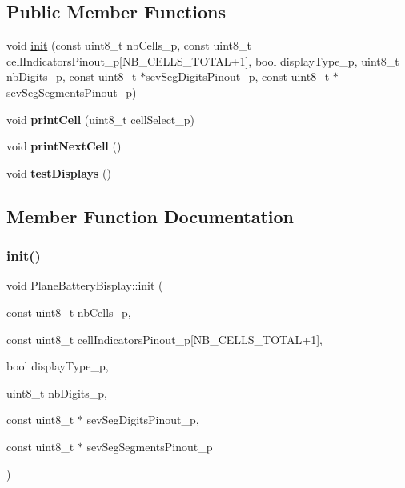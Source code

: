 \subsection*{Public Member Functions}
\begin{DoxyCompactItemize}
\item 
void \hyperlink{class_plane_battery_bisplay_aaa5bb0ec5fd6c31febf211dc1c10273b}{init} (const uint8\+\_\+t nb\+Cells\+\_\+p, const uint8\+\_\+t cell\+Indicators\+Pinout\+\_\+p\mbox{[}N\+B\+\_\+\+C\+E\+L\+L\+S\+\_\+\+T\+O\+T\+AL+1\mbox{]}, bool display\+Type\+\_\+p, uint8\+\_\+t nb\+Digits\+\_\+p, const uint8\+\_\+t $\ast$sev\+Seg\+Digits\+Pinout\+\_\+p, const uint8\+\_\+t $\ast$sev\+Seg\+Segments\+Pinout\+\_\+p)
\item 
\mbox{\label{class_plane_battery_bisplay_a2e5a1c0a536c707a2d02562210fa8d67}} 
void {\bfseries print\+Cell} (uint8\+\_\+t cell\+Select\+\_\+p)
\item 
\mbox{\label{class_plane_battery_bisplay_ae3c48c207bc32d8b76b7d5790574de60}} 
void {\bfseries print\+Next\+Cell} ()
\item 
\mbox{\label{class_plane_battery_bisplay_a1d55cf98e2230b5e19345c6243c5b9be}} 
void {\bfseries test\+Displays} ()
\end{DoxyCompactItemize}


\subsection{Member Function Documentation}
\mbox{\label{class_plane_battery_bisplay_aaa5bb0ec5fd6c31febf211dc1c10273b}} 
\subsubsection{\texorpdfstring{init()}{init()}}
{\footnotesize\ttfamily void Plane\+Battery\+Bisplay\+::init (\begin{DoxyParamCaption}\item[{const uint8\+\_\+t}]{nb\+Cells\+\_\+p,  }\item[{const uint8\+\_\+t}]{cell\+Indicators\+Pinout\+\_\+p\mbox{[}\+N\+B\+\_\+\+C\+E\+L\+L\+S\+\_\+\+T\+O\+T\+A\+L+1\mbox{]},  }\item[{bool}]{display\+Type\+\_\+p,  }\item[{uint8\+\_\+t}]{nb\+Digits\+\_\+p,  }\item[{const uint8\+\_\+t $\ast$}]{sev\+Seg\+Digits\+Pinout\+\_\+p,  }\item[{const uint8\+\_\+t $\ast$}]{sev\+Seg\+Segments\+Pinout\+\_\+p }\end{DoxyParamCaption})}


